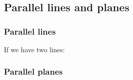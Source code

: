
\subsection{Parallel lines and planes}

\subsubsection{Parallel lines}

If we have two lines: 

\subsubsection{Parallel planes}

